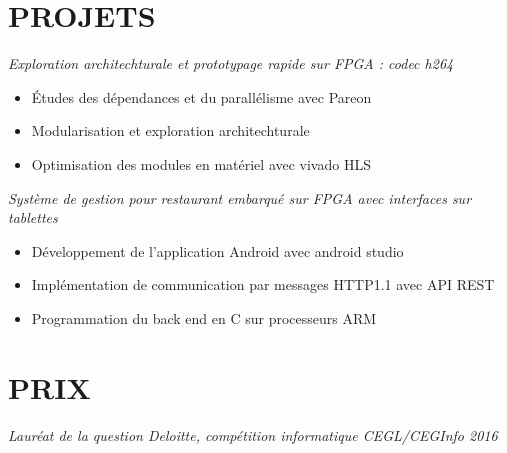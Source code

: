 \documentclass[margin, 10pt]{res} %
\begin{document}
\begin{resume}
 
\section{PROJETS}

{\sl Exploration architechturale et prototypage rapide sur FPGA : codec h264}
\begin{itemize} \itemsep -2pt %
\item \'Etudes des d\'ependances et du parall\'elisme avec Pareon
\item Modularisation et exploration architechturale
\item Optimisation des modules en mat\'eriel avec vivado HLS
\end{itemize} 

{\sl Syst\`eme de gestion pour restaurant embarqu\'e sur FPGA avec interfaces sur tablettes}
\begin{itemize} \itemsep -2pt %
\item D\'eveloppement de l'application Android avec android studio
\item  Impl\'ementation de communication par messages HTTP1.1 avec API REST
\item  Programmation du back end en C sur processeurs ARM
\end{itemize} 

 
\section{PRIX}

{\sl Laur\'eat de la question Deloitte, comp\'etition informatique CEGL/CEGInfo 2016}

\end{resume}
\end{document}
